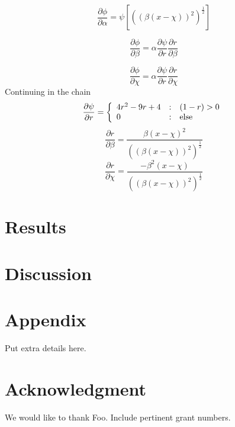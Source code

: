 \[
\frac{\partial \phi}{\partial \alpha} = \psi \left [ ((\beta(x-\chi))^2)^\frac{1}{2}\right ]
\]

\[
\frac{\partial \phi}{\partial \beta} = \alpha \frac{\partial
  \psi}{\partial r} \frac{\partial r}{\partial \beta}
\]

\[
\frac{\partial \phi}{\partial \chi} = \alpha \frac{\partial
  \psi}{\partial r} \frac{\partial r}{\partial \chi}
\]
Continuing in the chain
\[
\frac{\partial \psi}{\partial r} = \left\{ 
\begin{array}{l@{\quad:\quad}l}
4r^2 - 9r + 4 & (1-r) > 0\\
0 & \mbox{else}
\end{array} \right.
\]
\[
\frac{\partial r}{\partial \beta} = 
\frac{\beta(x-\chi)^2}{((\beta(x-\chi))^2)^\frac{1}{2}}
\]
\[
\frac{\partial r}{\partial \chi} = 
\frac{-\beta^2(x-\chi)}{((\beta(x-\chi))^2)^\frac{1}{2}}
\]

\section{Results}

\section{Discussion}

\section*{Appendix}
Put extra details here.

\section*{Acknowledgment}
We would like to thank Foo. Include pertinent grant numbers.




